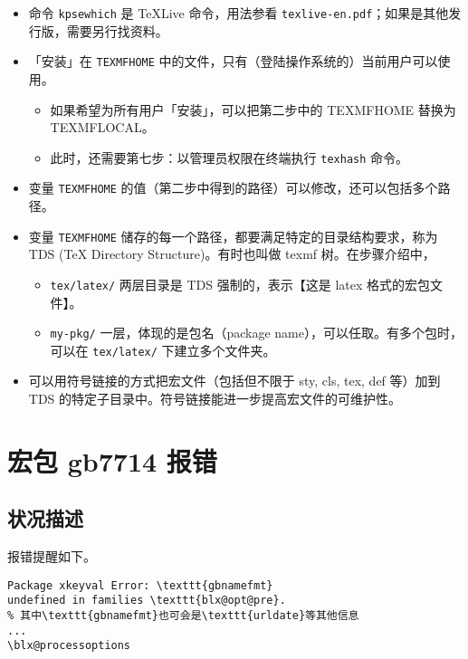 \documentclass[../Main/thesis.tex]{subfiles}
\begin{document}
\begin{itemize}
\item
  命令 \texttt{kpsewhich} 是 \TeX Live 命令，用法参看
  \texttt{texlive-en.pdf}；如果是其他发行版，需要另行找资料。
\item
  「安装」在 \texttt{TEXMFHOME}
  中的文件，只有（登陆操作系统的）当前用户可以使用。

  \begin{itemize}
  \item
    如果希望为所有用户「安装」，可以把第二步中的 TEXMFHOME 替换为
    TEXMFLOCAL。
  \item
    此时，还需要第七步：以管理员权限在终端执行 \texttt{texhash} 命令。
  \end{itemize}
\item
  变量 \texttt{TEXMFHOME}
  的值（第二步中得到的路径）可以修改，还可以包括多个路径。
\item
  变量 \texttt{TEXMFHOME}
  储存的每一个路径，都要满足特定的目录结构要求，称为 TDS (TeX Directory
  Structure)。有时也叫做 texmf 树。在步骤介绍中，

  \begin{itemize}
  \item
    \texttt{tex/latex/} 两层目录是 TDS 强制的，表示【这是 latex
    格式的宏包文件】。
  \item
    \texttt{my-pkg/} 一层，体现的是包名（package
    name），可以任取。有多个包时，可以在 \texttt{tex/latex/}
    下建立多个文件夹。
  \end{itemize}
\item
  可以用符号链接的方式把宏文件（包括但不限于 sty, cls, tex, def 等）加到
  TDS 的特定子目录中。符号链接能进一步提高宏文件的可维护性。
\end{itemize}

\section{宏包 gb7714 报错}

\subsection{状况描述}

报错提醒如下。

\begin{verbatim}
Package xkeyval Error: \texttt{gbnamefmt}
undefined in families \texttt{blx@opt@pre}.
% 其中\texttt{gbnamefmt}也可会是\texttt{urldate}等其他信息
...
\blx@processoptions
\end{verbatim}
\end{document}
